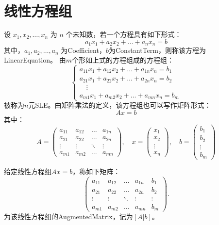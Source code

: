 \section{线性方程组}
\begin{definition}
	设 $x_1, x_2, \dots, x_n$ 为 $n$ 个未知数，若一个方程具有如下形式：
	\[
	a_1 x_1 + a_2 x_2 + \dots + a_n x_n = b
	\]
	其中，$a_1, a_2, \dots, a_n$ 为\gls{Coefficient}，$b$为\gls{ConstantTerm}，则称该方程为\gls{LinearEquation}。
	由$m$个形如上式的方程组成的方程组：
	\[
	\begin{cases}
		a_{11} x_1 + a_{12} x_2 + \dots + a_{1n} x_n = b_1 \\
		a_{21} x_1 + a_{22} x_2 + \dots + a_{2n} x_n = b_2 \\
		\quad \vdots \\
		a_{m1} x_1 + a_{m2} x_2 + \dots + a_{mn} x_n = b_m
	\end{cases}
	\]
	被称为$n$元\gls{SLE}。由矩阵乘法的定义，该方程组也可以写作矩阵形式：
	\[
	Ax=b
	\]
	其中：
	\[
	A =
	\begin{pmatrix}
		a_{11} & a_{12} & \dots & a_{1n} \\
		a_{21} & a_{22} & \dots & a_{2n} \\
		\vdots & \vdots & \ddots & \vdots \\
		a_{m1} & a_{m2} & \dots & a_{mn}
	\end{pmatrix}, \quad
	x =
	\begin{pmatrix}
		x_1 \\ x_2 \\ \vdots \\ x_n
	\end{pmatrix}, \quad
	b =
	\begin{pmatrix}
		b_1 \\ b_2 \\ \vdots \\ b_m
	\end{pmatrix}
	\]
\end{definition}
\begin{definition}
	给定线性方程组$Ax=b$，称如下矩阵：
	\[
	\begin{pmatrix}
		a_{11} & a_{12} & \dots & a_{1n} & b_1 \\
		a_{21} & a_{22} & \dots & a_{2n} & b_2 \\
		\vdots & \vdots & \ddots & \vdots & \vdots \\
		a_{m1} & a_{m2} & \dots & a_{mn} & b_m
	\end{pmatrix}.
	\]
	为该线性方程组的\gls{AugmentedMatrix}，记为$[A|b]$。
\end{definition}
